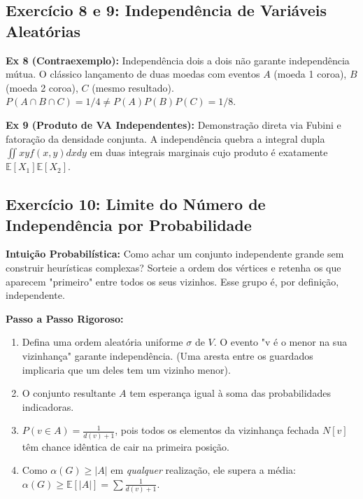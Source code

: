 \documentclass[11pt, a4paper]{article}
\begin{document}
\subsection*{Exercício 8 e 9: Independência de Variáveis Aleatórias}
\textbf{Ex 8 (Contraexemplo):} Independência dois a dois não garante independência mútua. O clássico lançamento de duas moedas com eventos $A$ (moeda 1 coroa), $B$ (moeda 2 coroa), $C$ (mesmo resultado). $P(A \cap B \cap C) = 1/4 \ne P(A)P(B)P(C) = 1/8$.

\textbf{Ex 9 (Produto de VA Independentes):} Demonstração direta via Fubini e fatoração da densidade conjunta. A independência quebra a integral dupla $\iint xy f(x,y) dx dy$ em duas integrais marginais cujo produto é exatamente $\mathbb{E}[X_1]\mathbb{E}[X_2]$.

\newpage

\subsection*{Exercício 10: Limite do Número de Independência por Probabilidade}
\textbf{Intuição Probabilística:} Como achar um conjunto independente grande sem construir heurísticas complexas? Sorteie a ordem dos vértices e retenha os que aparecem "primeiro" entre todos os seus vizinhos. Esse grupo é, por definição, independente.

\begin{center}
\end{center}

\textbf{Passo a Passo Rigoroso:}
\begin{enumerate}
    \item Defina uma ordem aleatória uniforme $\sigma$ de $V$. O evento "v é o menor na sua vizinhança" garante independência. (Uma aresta entre os guardados implicaria que um deles tem um vizinho menor).
    \item O conjunto resultante $A$ tem esperança igual à soma das probabilidades indicadoras.
    \item $P(v \in A) = \frac{1}{d(v)+1}$, pois todos os elementos da vizinhança fechada $N[v]$ têm chance idêntica de cair na primeira posição.
    \item Como $\alpha(G) \ge |A|$ em \textit{qualquer} realização, ele supera a média: $\alpha(G) \ge \mathbb{E}[|A|] = \sum \frac{1}{d(v)+1}$.
\end{enumerate}
\end{document}
